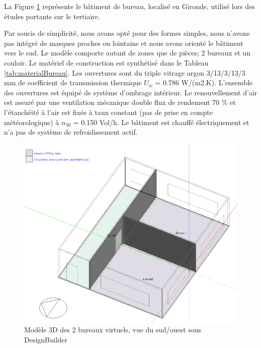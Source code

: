 La Figure \ref{fig:CasEtudeBureau} représente le bâtiment de bureau, localisé en Gironde, utilisé lors des études portants sur le tertiaire. 

Par soucis de simplicité, nous avons opté pour des formes simples, nous n'avons pas intégré de masques proches ou lointains et nous avons orienté le bâtiment vers le sud. Le modèle comporte autant de zones que de pièces; 2 bureaux et un couloir. Le matériel de construction est synthétisé dans le Tableau \ref{tab:materialBureau}. Les ouvertures sont du triple vitrage argon 3/13/3/13/3 mm de coefficient de transmission thermique $U_{w}$ = 0.786 W/(m2.K). L'ensemble des ouvertures est équipé de système d'ombrage intérieur. Le renouvellement d'air est assuré par une ventilation mécanique double flux de rendement 70 \% et l'étanchéité à l'air est fixée à taux constant (pas de prise en compte météorologique) à $n_{50}$ = 0.150 Vol/h. Le bâtiment est chauffé électriquement et n'a pas de système de refroidissement actif.

\begin{figure}[H]
\centering
\includegraphics[scale=0.55]{Images/CasEtudeBureau}
\caption{Modèle 3D des 2 bureaux virtuels, vue du sud/ouest sous DesignBuilder}
\label{fig:CasEtudeBureau}
\end{figure}

